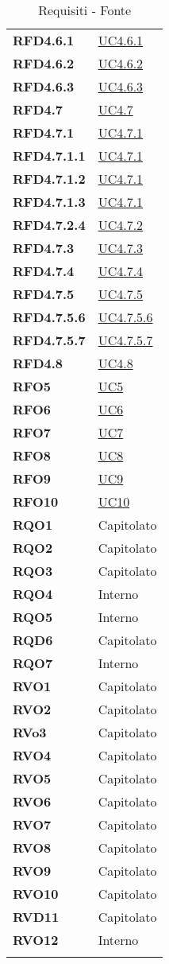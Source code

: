 \begin{longtable}[H]{>{\centering\bfseries}m{8cm} >{\centering\arraybackslash}m{8cm}}
    RFD4.6.1 & \hyperref[par:uc4.6.1]{UC4.6.1} \\
    RFD4.6.2 & \hyperref[par:uc4.6.2]{UC4.6.2} \\
    RFD4.6.3 & \hyperref[par:uc4.6.3]{UC4.6.3} \\
    RFD4.7 & \hyperref[ssub:uc4.7]{UC4.7} \\
    RFD4.7.1 & \hyperref[par:uc4.7.1]{UC4.7.1} \\
    RFD4.7.1.1 & \hyperref[par:uc4.7.1]{UC4.7.1} \\
    RFD4.7.1.2 & \hyperref[par:uc4.7.1]{UC4.7.1} \\
    RFD4.7.1.3 & \hyperref[par:uc4.7.1]{UC4.7.1} \\
    RFD4.7.2.4 & \hyperref[par:uc4.7.2]{UC4.7.2} \\
    RFD4.7.3 & \hyperref[par:uc4.7.3]{UC4.7.3} \\
    RFD4.7.4 & \hyperref[par:uc4.7.4]{UC4.7.4} \\
    RFD4.7.5 & \hyperref[par:uc4.7.5]{UC4.7.5} \\
    RFD4.7.5.6 & \hyperref[spar:uc4.7.5.6]{UC4.7.5.6} \\
    RFD4.7.5.7 & \hyperref[spar:uc4.7.5.7]{UC4.7.5.7} \\
    RFD4.8 & \hyperref[ssub:uc4.8]{UC4.8} \\
    RFO5 & \hyperref[sub:uc5]{UC5} \\
    RFO6 & \hyperref[sub:uc6]{UC6} \\
    RFO7 & \hyperref[sub:uc7]{UC7} \\
    RFO8 & \hyperref[sub:uc8]{UC8} \\
    RFO9 & \hyperref[sub:uc9]{UC9} \\
    RFO10 & \hyperref[sub:uc10]{UC10} \\
    RQO1 & Capitolato \\
    RQO2 & Capitolato \\
    RQO3 & Capitolato \\
    RQO4 & Interno \\
    RQO5 & Interno \\
    RQD6 & Capitolato \\
    RQO7 & Interno \\
    RVO1 & Capitolato \\
    RVO2 & Capitolato \\
    RVo3 & Capitolato \\
    RVO4 & Capitolato \\
    RVO5 & Capitolato \\
    RVO6 & Capitolato \\
    RVO7 & Capitolato \\
    RVO8 & Capitolato \\
    RVO9 & Capitolato \\
    RVO10 & Capitolato \\
    RVD11 & Capitolato \\
    RVO12 & Interno\\
    \caption{Requisiti - Fonte}%
    \label{tab:requisiti_fonte}
\end{longtable}
